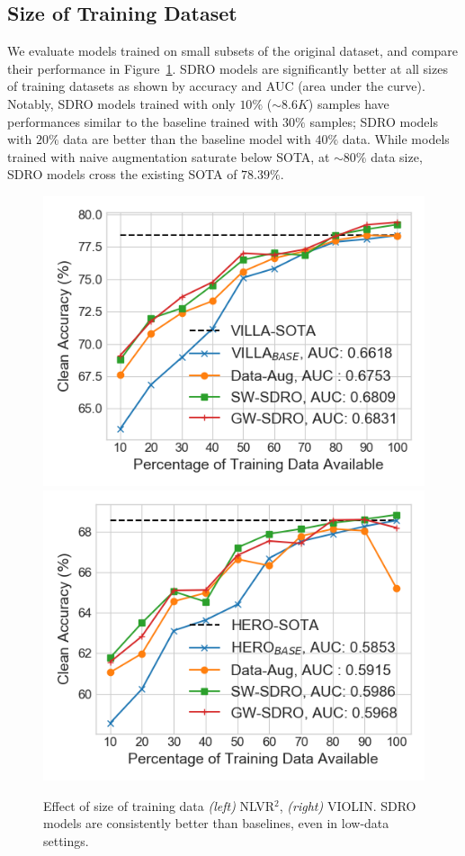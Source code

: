 \subsection{Size of Training Dataset}
We evaluate models trained on small subsets of the original dataset, and compare their performance in Figure~\ref{fig:lowres}.
SDRO models are significantly better at all sizes of training datasets as shown by accuracy and AUC (area under the curve).
Notably, SDRO models trained with only $10\%$ ($\sim8.6K$) samples have performances similar to the baseline trained with $30\%$ samples;
SDRO models with $20\%$ data are better than the baseline model with $40\%$ data.
While models trained with naive augmentation saturate below SOTA, at ${\sim}80\%$ data size, SDRO models cross the existing SOTA of $78.39\%$.

\begin{figure}[t]
    \centering
    \includegraphics[width=0.49\linewidth]{sdro/images/lowResource_auc.png}
    \includegraphics[width=0.49\linewidth]{sdro/images/violin_lowResource_auc.png}
    \caption{
    Effect of size of training data \textit{(left)} NLVR$^2$, \textit{(right)} VIOLIN.
    SDRO models are consistently better than baselines, even in low-data settings. 
    }
    \label{fig:lowres}
\end{figure}

